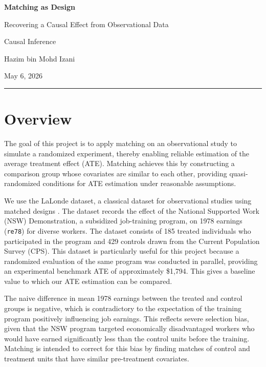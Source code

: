\documentclass[12pt, a4paper]{article}
\begin{document}
\begin{titlepage}
  \centering
  \vspace*{2cm}
  {\Huge\bfseries Matching as Design\par}
  \vspace{0.3cm}
  {\Large Recovering a Causal Effect from Observational Data\par}
  \vspace{0.5cm}
  {\large Causal Inference\par}
  \vspace{1cm}
  {\normalsize Hazim bin Mohd Izani\par}
  \vspace{2cm}
  {\normalsize May 6, 2026\par}
  \vfill
  \rule{0.6\linewidth}{0.4pt}
\end{titlepage}

\tableofcontents
\newpage

\section{Overview}

The goal of this project is to apply matching on an observational study to simulate a randomized experiment, thereby enabling reliable estimation of the average treatment effect (ATE). Matching achieves this by constructing a comparison group whose covariates are similar to each other, providing quasi-randomized conditions for ATE estimation under reasonable assumptions.

We use the LaLonde dataset, a classical dataset for observational studies using matched designs \citep{lalonde1986evaluating}. The dataset records the effect of the National Supported Work (NSW) Demonstration, a subsidized job-training program, on 1978 earnings (\texttt{re78}) for diverse workers. The dataset consists of 185 treated individuals who participated in the program and 429 controls drawn from the Current Population Survey (CPS). This dataset is particularly useful for this project because a randomized evaluation of the same program was conducted in parallel, providing an experimental benchmark ATE of approximately \$1{,}794. This gives a baseline value to which our ATE estimation can be compared.

The naive difference in mean 1978 earnings between the treated and control groups is negative, which is contradictory to the expectation of the training program positively influencing job earnings. This reflects severe selection bias, given that the NSW program targeted economically disadvantaged workers who would have earned significantly less than the control units before the training. Matching is intended to correct for this bias by finding matches of control and treatment units that have similar pre-treatment covariates.
\end{document}
